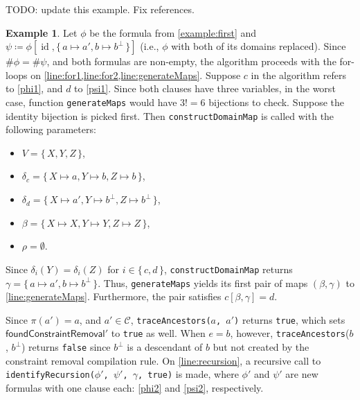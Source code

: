 \documentclass{article}
\theoremstyle{definition}
\newtheorem{example}{Example}
\theoremstyle{remark}
\DeclareMathOperator{\id}{id}
\begin{document}
TODO: update this example. Fix references.
\begin{example} \label{example}
  Let $\phi$ be the formula from \cref{example:first} and $\psi \coloneqq \phi[\id, \{\, a \mapsto a', b \mapsto b^\bot \,\}]$ (i.e., $\phi$ with both of its domains replaced). Since $\#\phi = \#\psi$, and both formulas are non-empty, the algorithm proceeds with the for-loops on \cref{line:for1,line:for2,line:generateMaps}. Suppose $c$ in the algorithm refers to \cref{phi1}, and $d$ to \cref{psi1}. Since both clauses have three variables, in the worst case, function \texttt{generateMaps} would have $3!=6$ bijections to check. Suppose the identity bijection is picked first. Then \texttt{constructDomainMap} is called with the following parameters:
  \begin{itemize}
  \item $V = \{\, X, Y, Z \,\}$,
  \item $\delta_c = \{\, X \mapsto a, Y \mapsto b, Z \mapsto b \,\}$,
  \item $\delta_d = \{\, X \mapsto a', Y \mapsto b^\bot, Z \mapsto b^\bot \,\}$,
  \item $\beta = \{\, X \mapsto X, Y \mapsto Y, Z \mapsto Z \,\}$,
  \item $\rho = \emptyset$.
  \end{itemize}
  Since $\delta_i(Y) = \delta_i(Z)$ for $i \in \{\, c, d \,\}$, \texttt{constructDomainMap} returns $\gamma = \{\, a \mapsto a', b \mapsto b^\bot \,\}$. Thus, \texttt{generateMaps} yields its first pair of maps $(\beta, \gamma)$ to \cref{line:generateMaps}. Furthermore, the pair satisfies $c[\beta, \gamma] = d$.

  Since $\pi(a') = a$, and $a' \in \mathcal{C}$, \texttt{traceAncestors($a$, $a'$)} returns \texttt{true}, which sets $\textsf{foundConstraintRemoval}'$ to \texttt{true} as well. When $e = b$, however, \texttt{traceAncestors}($b$, $b^\bot$) returns \texttt{false} since $b^\bot$ is a descendant of $b$ but not created by the constraint removal compilation rule. On \cref{line:recursion}, a recursive call to \texttt{identifyRecursion($\phi'$, $\psi'$, $\gamma$, true)} is made, where $\phi'$ and $\psi'$ are new formulas with one clause each: \cref{phi2} and \cref{psi2}, respectively.


\end{example}
\end{document}
